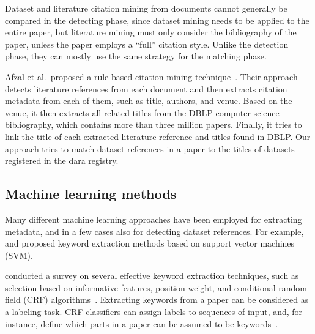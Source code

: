 \documentclass{IOS-Book-Article}
\newcommand{\dara}{\textsf{da\textbar ra}}
\begin{document}
Dataset and literature citation mining from documents cannot generally be compared in the detecting phase, since dataset mining needs to be applied to the entire paper, but literature mining must only consider the bibliography of the paper, unless the paper employs a “full” citation style.
Unlike the detection phase, they can mostly use the same strategy for the matching phase. 

Afzal et al.\ proposed a rule-based citation mining technique~\cite{Afzal2010}.
Their approach detects literature references from each document and then extracts citation metadata from each of them, such as title, authors, and venue. Based on the venue, it then extracts all related titles from the DBLP computer science bibliography, which contains more than three million papers.
Finally, it tries to link the title of each extracted literature reference and 
titles found in DBLP.
Our approach tries to match dataset references in a paper to the titles of datasets registered in the {\dara} registry.

\subsection{Machine learning methods}
Many different machine learning approaches have been employed for extracting metadata, and in a few cases also for detecting dataset references.
For example, \citeauthor{Zhang2006} \citeyearpar{Zhang2006} and \citeauthor{Han2003} \citeyearpar{Han2003} proposed keyword extraction methods based on support vector machines (SVM). 

\citeauthor{Kaur2010} conducted a survey on several effective keyword extraction techniques, such as selection based on informative features, position weight, and conditional random field (CRF) algorithms~\citeyearpar{Kaur2010}.
Extracting keywords from a paper can be considered as a labeling task.
CRF classifiers can assign labels to sequences of input, and, for instance, define which parts in a paper can be assumed to be keywords~\citep{ZHANG2008}.
\end{document}
